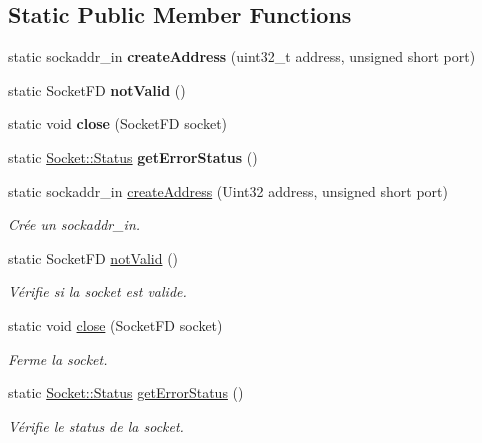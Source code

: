 \subsection*{Static Public Member Functions}
\begin{DoxyCompactItemize}
\item 
\hypertarget{classmognetwork_1_1_os_socket_aec3ee68397d04abab9003ddd68e86793}{static sockaddr\-\_\-in {\bfseries create\-Address} (uint32\-\_\-t address, unsigned short port)}\label{classmognetwork_1_1_os_socket_aec3ee68397d04abab9003ddd68e86793}

\item 
\hypertarget{classmognetwork_1_1_os_socket_a5b2cf6583d7bc3a640a162a6ae3dead7}{static Socket\-F\-D {\bfseries not\-Valid} ()}\label{classmognetwork_1_1_os_socket_a5b2cf6583d7bc3a640a162a6ae3dead7}

\item 
\hypertarget{classmognetwork_1_1_os_socket_afc41f453da34be5cce9fa5470ca3697a}{static void {\bfseries close} (Socket\-F\-D socket)}\label{classmognetwork_1_1_os_socket_afc41f453da34be5cce9fa5470ca3697a}

\item 
\hypertarget{classmognetwork_1_1_os_socket_a331f63335ee89ae3eaa24a59cbada192}{static \hyperlink{classmognetwork_1_1_socket_aa187a8394ac0d6203af0ec7f021ca15f}{Socket\-::\-Status} {\bfseries get\-Error\-Status} ()}\label{classmognetwork_1_1_os_socket_a331f63335ee89ae3eaa24a59cbada192}

\item 
static sockaddr\-\_\-in \hyperlink{classmognetwork_1_1_os_socket_ae012b09d94070d07925a03cdc3a8a6ae}{create\-Address} (Uint32 address, unsigned short port)
\begin{DoxyCompactList}\small\item\em Crée un sockaddr\-\_\-in. \end{DoxyCompactList}\item 
static Socket\-F\-D \hyperlink{classmognetwork_1_1_os_socket_a5b2cf6583d7bc3a640a162a6ae3dead7}{not\-Valid} ()
\begin{DoxyCompactList}\small\item\em Vérifie si la socket est valide. \end{DoxyCompactList}\item 
static void \hyperlink{classmognetwork_1_1_os_socket_afc41f453da34be5cce9fa5470ca3697a}{close} (Socket\-F\-D socket)
\begin{DoxyCompactList}\small\item\em Ferme la socket. \end{DoxyCompactList}\item 
static \hyperlink{classmognetwork_1_1_socket_aa187a8394ac0d6203af0ec7f021ca15f}{Socket\-::\-Status} \hyperlink{classmognetwork_1_1_os_socket_a331f63335ee89ae3eaa24a59cbada192}{get\-Error\-Status} ()
\begin{DoxyCompactList}\small\item\em Vérifie le status de la socket. \end{DoxyCompactList}\end{DoxyCompactItemize}


